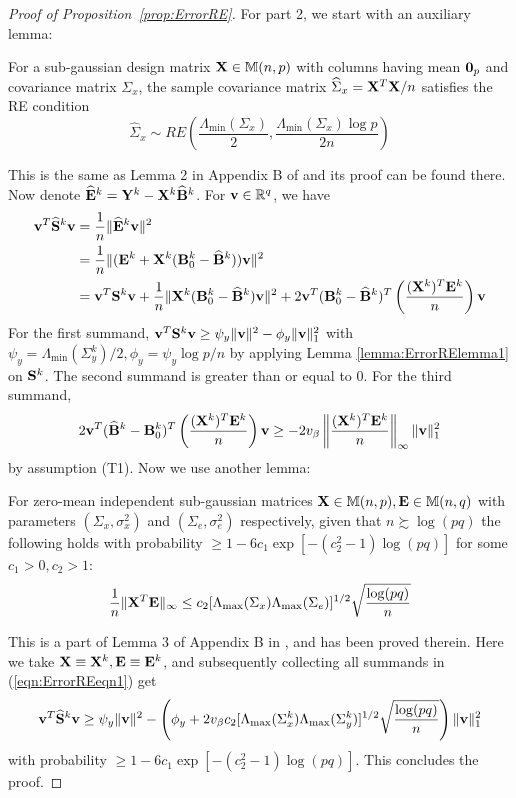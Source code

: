 \documentclass[fleqn,11pt]{article}
\numberwithin{equation}{section}
\begin{document}
\begin{proof}[Proof of Proposition~\ref{prop:ErrorRE}]
For part 2, we start with an auxiliary lemma:
%
\begin{Lemma}\label{lemma:ErrorRElemma1}
For a sub-gaussian design matrix ${\mathbf{X}} \in {\mathbb{M}}(n,p)$ with columns having mean ${\bf 0}_p$ and covariance matrix $\Sigma_x$, the sample covariance matrix $\widehat \Sigma_x = {\mathbf{X}}^T {\mathbf{X}}/n$ satisfies the RE condition
%
$$
\widehat \Sigma_x \sim RE \left( \frac{\Lambda_{\min} ( \Sigma_x) }{2}, \frac{\Lambda_{\min} ( \Sigma_x) \log p }{2 n} \right)
$$
\end{Lemma}
%
This is the same as Lemma 2 in Appendix B of \cite{LinEtal16} and its proof can be found there. Now denote $\widehat {{\mathbf{E}}}^k = {\mathbf{Y}}^k - {\mathbf{X}}^k \widehat {{\mathbf{B}}}^k$. For ${\bf{v}} \in {\mathbb{R}}^q$, we have
%
\begin{align}\label{eqn:ErrorREeqn1}
{\bf{v}}^T \widehat {{\mathbf{S}}}^k {\bf{v}} &= \frac{1}{n} \| \widehat {{\mathbf{E}}}^k {\bf{v}} \|^2 \notag\\
&= \frac{1}{n} \| ({\mathbf{E}}^k + {\mathbf{X}}^k ( {\mathbf{B}}_0^k - \widehat {{\mathbf{B}}}^k )){\bf{v}} \|^2 \notag\\
&= {\bf{v}}^T {\mathbf{S}}^k {\bf{v}} + \frac{1}{n} \| {\mathbf{X}}^k ({\mathbf{B}}_0^k - \widehat {{\mathbf{B}}}^k) {\bf{v}} \|^2 + 2 {\bf{v}}^T ({\mathbf{B}}_0^k - \widehat {{\mathbf{B}}}^k)^T \left( \frac {({\mathbf{X}}^k)^T {\mathbf{E}}^k}{n} \right) {\bf{v}}
\end{align}
%
For the first summand, $ {\bf{v}}^T {\mathbf{S}}^k {\bf{v}} \geq \psi_y \| {\bf{v}} \|^2 - \phi_y \| {\bf{v}} \|_1^2$ with $\psi_y = \Lambda_{\min} (\Sigma_y^k)/2, \phi_y = \psi_y \log p/n$ by applying Lemma \ref{lemma:ErrorRElemma1} on ${\mathbf{S}}^k$. The second summand is greater than or equal to 0. For the third summand,
%
$$
2 {\bf{v}}^T (\widehat {{\mathbf{B}}}^k - {\mathbf{B}}_0^k)^T \left( \frac {({\mathbf{X}}^k)^T {\mathbf{E}}^k}{n} \right) {\bf{v}} \geq
-2 v_\beta \left\| \frac {({\mathbf{X}}^k)^T {\mathbf{E}}^k}{n} \right\|_\infty \| {\bf{v}} \|_1^2
$$
%
by assumption (T1). Now we use another lemma:
\begin{Lemma}\label{lemma:ErrorRElemma2}
For zero-mean independent sub-gaussian matrices ${\mathbf{X}} \in {\mathbb{M}}(n,p), {\mathbf{E}} \in {\mathbb{M}}(n,q)$ with parameters $(\Sigma_x, \sigma_x^2)$ and $(\Sigma_e, \sigma_e^2)$ respectively, given that $n \succsim \log(pq)$ the following holds with probability $\geq 1 - 6c_1 \exp [-(c_2^2-1) \log(pq)]$ for some $c_1 >0, c_2 > 1$:
%
$$
\frac{1}{n} \| {\mathbf{X}}^T {\mathbf{E}} \|_\infty \leq c_2 [ \Lambda_{\max} (\Sigma_x) \Lambda_{\max} (\Sigma_e) ]^{1/2} \sqrt{\frac{ \log(pq)}{n}}
$$
%
\end{Lemma}
%
This is a part of Lemma 3 of Appendix B in \cite{LinEDtal16}, and has been proved therein. Here we take ${\mathbf{X}} \equiv {\mathbf{X}}^k, {\mathbf{E}} \equiv {\mathbf{E}}^k$, and subsequently collecting all summands in (\ref{eqn:ErrorREeqn1}) get
%
$$
{\bf{v}}^T \widehat{ {\mathbf{S}}}^k {\bf{v}} \geq \psi_y \| {\bf{v}} \|^2 - \left( \phi_y + 2 v_\beta c_2 [ \Lambda_{\max} (\Sigma_x^k) \Lambda_{\max} (\Sigma_y^k) ]^{1/2} \sqrt{\frac{ \log(pq)}{n}} \right) \| {\bf{v}} \|_1^2
$$
with probability $\geq 1 - 6c_1 \exp [-(c_2^2-1) \log(pq)]$. This concludes the proof.
\end{proof}
\end{document}
